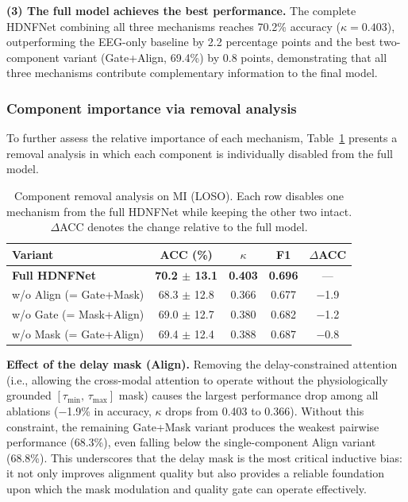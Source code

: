 \documentclass[preprint,12pt,authoryear]{elsarticle}
\begin{document}
\noindent\textbf{(3) The full model achieves the best performance.} The complete HDNFNet combining all three mechanisms reaches 70.2\% accuracy ($\kappa = 0.403$), outperforming the EEG-only baseline by 2.2 percentage points and the best two-component variant (Gate+Align, 69.4\%) by 0.8 points, demonstrating that all three mechanisms contribute complementary information to the final model.


\subsubsection{Component importance via removal analysis}
\label{sec:ablation_removal}

To further assess the relative importance of each mechanism, Table~\ref{tab:ablation_removal} presents a removal analysis in which each component is individually disabled from the full model.

\begin{table}[t]
\centering
\caption{Component removal analysis on MI (LOSO). Each row disables one mechanism from the full HDNFNet while keeping the other two intact. $\Delta$ACC denotes the change relative to the full model.}
\label{tab:ablation_removal}
\small
\begin{tabular}{lcccc}
\toprule
Variant & ACC (\%) & $\kappa$ & F1 & $\Delta$ACC \\
\midrule
\textbf{Full HDNFNet} & \textbf{70.2 $\pm$ 13.1} & \textbf{0.403} & \textbf{0.696} & --- \\
w/o Align (= Gate+Mask) & 68.3 $\pm$ 12.8 & 0.366 & 0.677 & $-$1.9 \\
w/o Gate \;(= Mask+Align) & 69.0 $\pm$ 12.7 & 0.380 & 0.682 & $-$1.2 \\
w/o Mask (= Gate+Align) & 69.4 $\pm$ 12.4 & 0.388 & 0.687 & $-$0.8 \\
\bottomrule
\end{tabular}
\end{table}

\noindent\textbf{Effect of the delay mask (Align).} Removing the delay-constrained attention (i.e., allowing the cross-modal attention to operate without the physiologically grounded $[\tau_{\min},\, \tau_{\max}]$ mask) causes the largest performance drop among all ablations ($-$1.9\% in accuracy, $\kappa$ drops from 0.403 to 0.366). Without this constraint, the remaining Gate+Mask variant produces the weakest pairwise performance (68.3\%), even falling below the single-component Align variant (68.8\%). This underscores that the delay mask is the most critical inductive bias: it not only improves alignment quality but also provides a reliable foundation upon which the mask modulation and quality gate can operate effectively.
\end{document}
